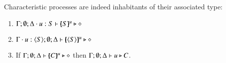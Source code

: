 



Characteristic processes are indeed inhabitants of their associated type:

\begin{proposition}\rm
\label{pro:characteristic}
\begin{enumerate}
\item $\Gamma; \emptyset; \Delta \cdot u:S \vdash [\!\!(S)\!\!]^{u} \triangleright \diamond$ 
\item $\Gamma \cdot u:\langle S \rangle; \emptyset; \Delta \vdash [\!\!(\langle S \rangle)\!\!]^{u} \triangleright \diamond$
\item 	If $\Gamma; \emptyset; \Delta \vdash [\!\!(C)\!\!]^{u} \triangleright \diamond$
	then
	$\Gamma; \emptyset; \Delta \vdash u \triangleright C$.
\end{enumerate}
\end{proposition}

